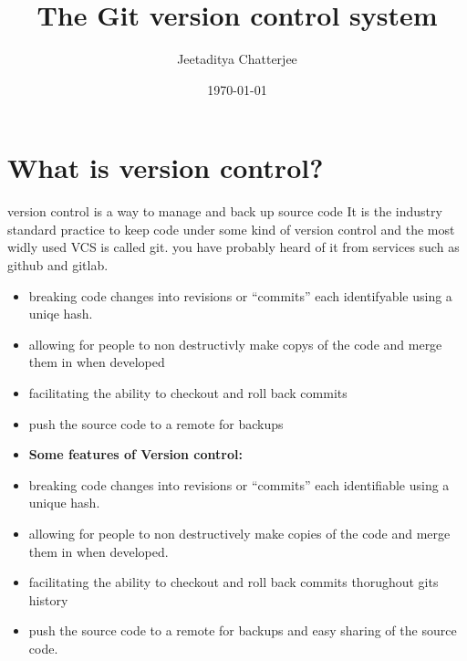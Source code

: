 \documentclass[a4paper]{article}
\author{Jeetaditya Chatterjee}
\date{\today}
\title{The Git version control system}
\begin{document}
\maketitle


\section*{What is version control?}
\label{sec:org1805b0b}
\begin{notes}
	version control is a way to manage and back up source code
	It is the industry standard practice to keep code under some kind of version
	control and the most widly used VCS is called git. you have probably heard of it
	from services such as github and gitlab.

	\begin{itemize}
		\item breaking code changes into revisions or ``commits'' each identifyable using a
		      uniqe hash.
		\item allowing for people to non destructivly make copys of the code and merge them
		      in when developed
		\item facilitating the ability to checkout and roll back commits
		\item push the source code to a remote for backups
	\end{itemize}
\end{notes}

\begin{itemize}
	\item \textbf{Some features of Version control:}
	\item breaking code changes into revisions or ``commits'' each identifiable using a
	      unique hash.
	\item allowing for people to non destructively make copies of the code and merge them
	      in when developed.
	\item facilitating the ability to checkout and roll back commits thorughout gits
	      history
	\item push the source code to a remote for backups and easy sharing of the source
	      code.
\end{itemize}
\end{document}

